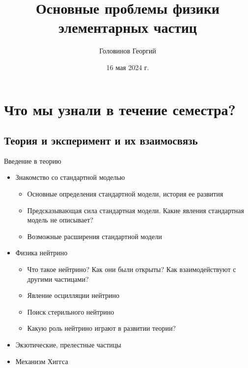 \documentclass[hyperref={colorlinks,citecolor=blue,linkcolor=blue,urlcolor=blue}]{beamer}
\title{Основные проблемы физики элементарных частиц}
\author{Головинов Георгий}
\institute{МФТИ, 2-304}
\date{16 мая 2024 г.}
\begin{document}
\begin{frame}
  \titlepage
\end{frame}


\section{Что мы узнали в течение семестра?}
\subsection{Теория и эксперимент и их взаимосвязь}
\begin{frame}{Введение в теорию}

\begin{itemize}
    \item Знакомство со стандартной моделью
    \begin{itemize}
        \item Основные определения стандартной модели, история ее развития
        \item Предсказывающая сила стандартная модели. Какие явления стандартная модель не описывает?
        \item Возможные расширения стандартной модели
    \end{itemize}
    \item Физика нейтрино 
    \begin{itemize}
        \item Что такое нейтрино? Как они были открыты? Как взаимодействуют с другими частицами?
        \item Явление осцилляции нейтрино
        \item Поиск стерильного нейтрино
        \item Какую роль нейтрино играют в развитии теории?
    \end{itemize}
    \item Экзотические, прелестные частицы
    \item Механизм Хиггса
\end{itemize}

\end{frame}
\end{document}
